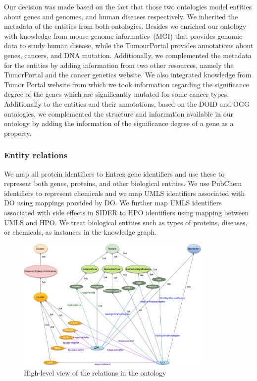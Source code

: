 \hspace*{3.5mm} Our decision was made based on the fact that those two ontologies model entities about genes and genomes, and human diseases respectively. We inherited the metadata of the entities from both ontologies. Besides we enriched our ontology with knowledge from mouse genome informatics~(MGI) that provides genomic data to study human disease, while the TumourPortal provides annotations about genes, cancers, and DNA mutation. Additionally, we complemented the metadata for the entities by adding information from two other resources, namely the TumorPortal and the cancer genetics website. We also integrated knowledge from Tumor Portal website from which we took information regarding the significance degree of the genes which are significantly mutated for some cancer types. Additionally to the entities and their annotations, based on the DOID and OGG ontologies, we complemented the structure and information available in our ontology by adding the information of the significance degree of a gene as a property. 

\subsubsection{Entity relations} 
We map all protein identifiers to Entrez gene identifiers and use these to represent both genes, proteins, and other biological entities. We use PubChem identifiers to represent chemicals and we map UMLS identifiers associated with DO using mappings provided by DO. We further map UMLS identifiers associated with side effects in SIDER to HPO identifiers using mapping between UMLS and HPO. We treat biological entities such as types of proteins, diseases, or chemicals, as instances in the knowledge graph. 

\begin{figure}
	\centering
	\includegraphics[width=0.8\linewidth,height=65mm]{images/GeneralRelations-Ontology.png}
	\caption{High-level view of the relations in the ontology}
	\label{fig:main_ontology_relations}
	\vspace{-2mm}
\end{figure}

